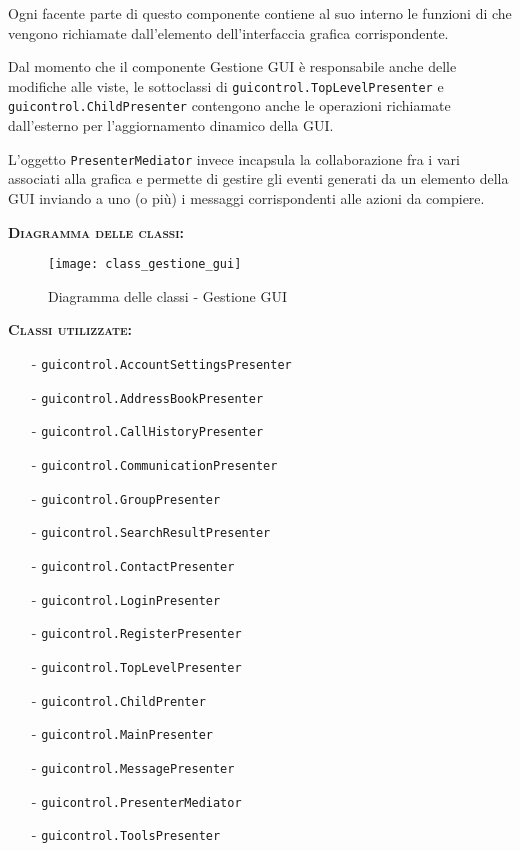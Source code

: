 \begin{description}
Ogni  facente parte di questo componente contiene al suo interno le funzioni di  che vengono richiamate dall'elemento dell'interfaccia grafica corrispondente.

Dal momento che il componente \textsf{Gestione GUI} è responsabile anche delle modifiche alle viste, le sottoclassi di \texttt{guicontrol.TopLevelPresenter}  e \texttt{guicontrol.ChildPresenter} contengono anche le operazioni richiamate dall'esterno per l'aggiornamento dinamico della GUI\@.

L'oggetto \texttt{PresenterMediator} invece incapsula la collaborazione fra i vari  associati alla grafica e permette di gestire gli eventi generati da un elemento della GUI inviando a uno (o più)  i messaggi corrispondenti alle azioni da compiere.

	\item{\scshape\bfseries Diagramma delle classi:}\\
  \begin{figure}[H]
    \centering
    \texttt{[image: class\_gestione\_gui]}
    \caption{Diagramma delle classi - Gestione GUI}\label{fig:gestionegui}
  \end{figure}

	\item{\scshape\bfseries Classi utilizzate:}\\
	\begin{itemize}[noitemsep,nolistsep]
	  \item[-] \texttt{guicontrol.AccountSettingsPresenter}
	  \item[-] \texttt{guicontrol.AddressBookPresenter}
	  \item[-] \texttt{guicontrol.CallHistoryPresenter}
	  \item[-] \texttt{guicontrol.CommunicationPresenter}
	  \item[-] \texttt{guicontrol.GroupPresenter}	 
	  \item[-] \texttt{guicontrol.SearchResultPresenter}	   
	  \item[-] \texttt{guicontrol.ContactPresenter}
	  \item[-] \texttt{guicontrol.LoginPresenter}
	  \item[-] \texttt{guicontrol.RegisterPresenter}	 
	  \item[-] \texttt{guicontrol.TopLevelPresenter}	  
	  \item[-] \texttt{guicontrol.ChildPrenter}	  
	  \item[-] \texttt{guicontrol.MainPresenter}
		\item[-] \texttt{guicontrol.MessagePresenter}
		\item[-] \texttt{guicontrol.PresenterMediator}
	  \item[-] \texttt{guicontrol.ToolsPresenter}
	\end{itemize}
\end{description}


